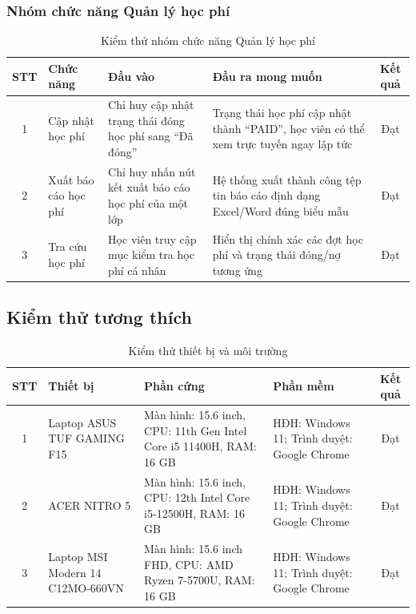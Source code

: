 \documentclass[../DoAn.tex]{subfiles}
\begin{document}
\subsubsection{Nhóm chức năng Quản lý học phí}
\begin{table}[H]
\centering
\begin{tabular}{|c|p{3.2cm}|p{3.5cm}|p{5.5cm}|c|}
\hline
\textbf{STT} & \textbf{Chức năng} & \textbf{Đầu vào} & \textbf{Đầu ra mong muốn} & \textbf{Kết quả} \\ \hline
1 & Cập nhật học phí & Chỉ huy cập nhật trạng thái đóng học phí sang ``Đã đóng'' & Trạng thái học phí cập nhật thành ``PAID'', học viên có thể xem trực tuyến ngay lập tức & Đạt \\ \hline
2 & Xuất báo cáo học phí & Chỉ huy nhấn nút kết xuất báo cáo học phí của một lớp & Hệ thống xuất thành công tệp tin báo cáo định dạng Excel/Word đúng biểu mẫu & Đạt \\ \hline
3 & Tra cứu học phí & Học viên truy cập mục kiểm tra học phí cá nhân & Hiển thị chính xác các đợt học phí và trạng thái đóng/nợ tương ứng & Đạt \\ \hline
\end{tabular}
\caption{Kiểm thử nhóm chức năng Quản lý học phí}
\label{tab:quan_ly_hoc_phi}
\end{table}


\subsection{Kiểm thử tương thích}

\begin{table}[H]
\centering
\begin{tabular}{|c|p{3.2cm}|p{5cm}|p{4.5cm}|c|}
\hline
\textbf{STT} & \textbf{Thiết bị} & \textbf{Phần cứng} & \textbf{Phần mềm} & \textbf{Kết quả} \\ \hline
1 & Laptop ASUS TUF GAMING F15 & Màn hình: 15.6 inch, CPU: 11th Gen Intel Core i5 11400H, RAM: 16 GB & HĐH: Windows 11; Trình duyệt: Google Chrome & Đạt \\ \hline
2 & ACER NITRO 5 & Màn hình: 15.6 inch, CPU: 12th Intel Core i5-12500H, RAM: 16 GB & HĐH: Windows 11; Trình duyệt: Google Chrome & Đạt \\ \hline
3 & Laptop MSI Modern 14 C12MO-660VN & Màn hình: 15.6 inch FHD, CPU: AMD Ryzen 7-5700U, RAM: 16 GB & HĐH: Windows 11; Trình duyệt: Google Chrome & Đạt \\ \hline
\end{tabular}
\caption{Kiểm thử thiết bị và môi trường}
\label{tab:thiet_bi_moi_truong}
\end{table}
\end{document}

